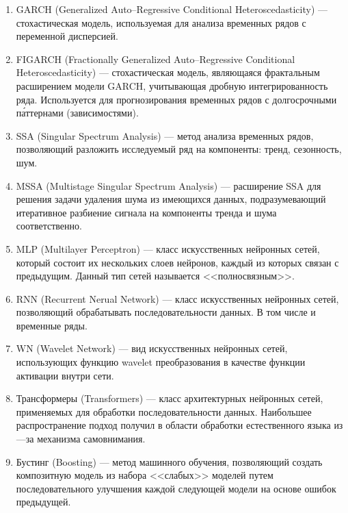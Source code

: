 \documentclass[a4paper, 12pt]{article}
\begin{document}
\begin{enumerate}
		\item GARCH (Generalized Auto--Regressive Conditional Heteroscedasticity) --- стохастическая модель, используемая для анализа временных рядов с переменной дисперсией. 
		\item FIGARCH (Fractionally Generalized Auto--Regressive Conditional Heteroscedasticity) --- стохастическая модель, являющаяся фрактальным расширением модели GARCH, учитывающая дробную интегрированность ряда. Используется для прогнозирования временных рядов с долгосрочными п\'{а}ттернами (зависимостями).
		\item SSA (Singular Spectrum Analysis) --- метод анализа временных рядов, позволяющий разложить исследуемый ряд на компоненты: тренд, сезонность, шум.
		\item MSSA (Multistage Singular Spectrum Analysis) --- расширение SSA для решения задачи удаления шума из имеющихся данных, подразумевающий итеративное разбиение сигнала на компоненты тренда и шума соответственно.
		\item MLP (Multilayer Perceptron) --- класс искусственных нейронных сетей, который состоит их нескольких слоев нейронов, каждый из которых связан с предыдущим. Данный тип сетей называется <<полносвязным>>.
		\item RNN (Recurrent Nerual Network) --- класс искусственных нейронных сетей, позволяющий обрабатывать последовательности данных. В том числе и временные ряды.
		\item WN (Wavelet Network) --- вид искусственных нейронных сетей, использующих функцию wavelet преобразования в качестве функции активации внутри сети.
		\item Трансформеры (Transformers) --- класс архитектурных нейронных сетей, применяемых для обработки последовательности данных. Наибольшее распространение подход получил в области обработки естественного языка из---за механизма самовнимания.
		\item Бустинг (Boosting) --- метод машинного обучения, позволяющий создать композитную модель из набора <<слабых>> моделей путем последовательного улучшения каждой следующей модели на основе ошибок предыдущей.
	\end{enumerate}
\end{document}
